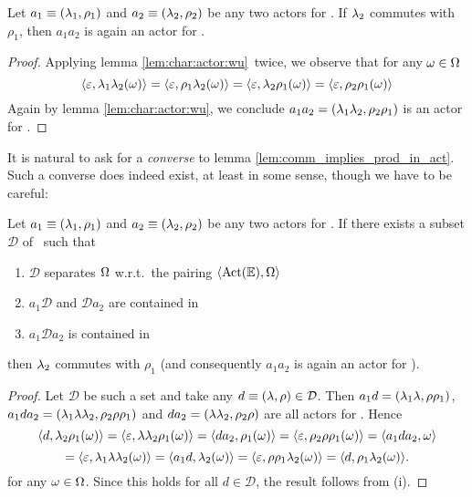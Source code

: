 \begin{lemma} \label{lem:comm_implies_prod_in_act}
Let\/ $a_1 \equiv (\lambda_1,\rho_1)$ and\/ $a_2 \equiv (\lambda_2,\rho_2)$ be any two actors for\/ \EE\@.
If\/ $\lambda_2$ commutes with $\rho_1$, then\/ $a_1 a_2$ is again an actor for \EE\@.
\end{lemma}
\begin{proof}
  Applying lemma \ref{lem:char:actor:wu}\ twice, we observe that for any $\omega \in \Omega$
  $$  \langle \varepsilon,\lambda_1\lambda_2(\omega) \rangle
        = \langle \varepsilon,\rho_1\lambda_2(\omega) \rangle
        = \langle \varepsilon,\lambda_2\rho_1(\omega) \rangle
        = \langle \varepsilon,\rho_2\rho_1(\omega) \rangle  $$
 Again by lemma \ref{lem:char:actor:wu}, we conclude
 $a_1 a_2 = (\lambda_1\lambda_2, \rho_2\rho_1)$ is an actor for \EE.
\end{proof}
\vspace{2ex}


It is natural to ask for a {\em converse\/} to lemma \ref{lem:comm_implies_prod_in_act}\@.
Such a converse does indeed exist, at least in some sense,
though we have to be careful:

\begin{lemma}  \label{lem:comm:converse}
Let\/ $a_1 \equiv (\lambda_1,\rho_1)$ and\/ $a_2 \equiv (\lambda_2,\rho_2)$ be any two actors for\/ \EE\@.
If there exists a subset\/ ${\mathcal D}$ of \ActE\ such that
  \begin{enumerate}
     \item ${\mathcal D}$ separates $\Omega$ w.r.t.\ the pairing $\langle \mbox{\rm Act}(\mathbb{E}),\Omega \rangle$
     \item $a_1 {\mathcal D}$ and ${\mathcal D} a_2$ are contained in \ActE
     \item $a_1 {\mathcal D} a_2$ is contained in \ActE
  \end{enumerate}
  then $\lambda_2$ commutes with $\rho_1$
  (and consequently\/ $a_1 a_2$ is again an actor for \EE).
\end{lemma}
\begin{proof}
  Let ${\mathcal D}$ be such a set and
  take any $d \equiv (\lambda,\rho) \in {\mathcal D}$\@. Then
  $a_1 d = (\lambda_1\lambda, \rho\rho_1)$,
  $a_1 d a_2 = (\lambda_1\lambda\lambda_2,\rho_2\rho\rho_1)$
  and $d a_2 = (\lambda\lambda_2, \rho_2\rho)$
  are all actors for \EE\@. Hence
  $$ \langle d,\lambda_2\rho_1(\omega) \rangle
        = \langle \varepsilon,\lambda\lambda_2\rho_1(\omega) \rangle
        = \langle d a_2,\rho_1(\omega) \rangle
        = \langle \varepsilon,\rho_2\rho\rho_1(\omega) \rangle
        = \langle a_1 d a_2,\omega \rangle $$
  $$    = \langle \varepsilon,\lambda_1\lambda\lambda_2(\omega) \rangle
        = \langle a_1 d,\lambda_2(\omega) \rangle
        = \langle \varepsilon,\rho\rho_1\lambda_2(\omega) \rangle
        = \langle d,\rho_1\lambda_2(\omega) \rangle.  $$
  for any $\omega\in \Omega$.
  Since this holds for all $d\in {\mathcal D}$, the result follows from (i).
\end{proof}

